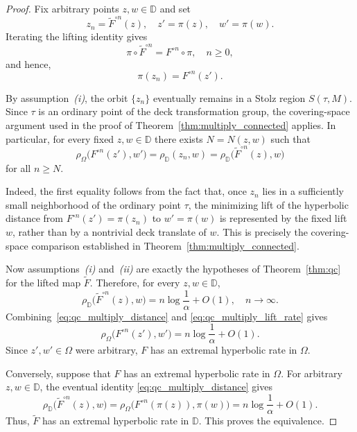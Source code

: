 \documentclass[12pt]{amsart}
\numberwithin{equation}{section}
\theoremstyle{plain}
\theoremstyle{definition}
\begin{document}
\begin{proof}
Fix arbitrary points $z,w\in\mathbb{D}$ and set
\begin{equation*}
z_n=\widetilde F^{\circ n}(z),
\quad
z'=\pi(z),
\quad
w'=\pi(w).
\end{equation*}
Iterating the lifting identity gives
\begin{equation*}
\label{eq:qc_multiply_lift}
\pi\circ\widetilde F^{\circ n}
=
F^{\circ n}\circ\pi,
\quad n\geq0,
\end{equation*}
and hence,
\begin{equation*}
\pi(z_n)=F^{\circ n}(z').
\end{equation*}

By assumption~\emph{(i)}, the orbit $\{z_n\}$ eventually remains in
a Stolz region $S(\tau,M)$. Since $\tau$ is an ordinary point of the
deck transformation group, the covering-space argument used in the
proof of Theorem~\ref{thm:multiply_connected} applies. In particular,
for every fixed $z,w\in\mathbb{D}$ there exists $N=N(z,w)$ such that
\begin{equation}
\label{eq:qc_multiply_distance}
\rho_\Omega\bigl(F^{\circ n}(z'),w'\bigr)
=
\rho_{\mathbb{D}}(z_n,w)
=
\rho_{\mathbb{D}}
\bigl(\widetilde F^{\circ n}(z),w\bigr)
\end{equation}
for all $n\geq N$.

Indeed, the first equality follows from the fact that, once $z_n$
lies in a sufficiently small neighborhood of the ordinary point
$\tau$, the minimizing lift of the hyperbolic distance from
$F^{\circ n}(z')=\pi(z_n)$ to $w'=\pi(w)$ is represented by the fixed
lift $w$, rather than by a nontrivial deck translate of $w$. This is
precisely the covering-space comparison established in
Theorem~\ref{thm:multiply_connected}.

Now assumptions~\emph{(i)} and~\emph{(ii)} are exactly the hypotheses
of Theorem~\ref{thm:qc} for the lifted map $\widetilde F$. Therefore,
for every $z,w\in\mathbb{D}$,
\begin{equation}
\label{eq:qc_multiply_lift_rate}
\rho_{\mathbb{D}}
\bigl(\widetilde F^{\circ n}(z),w\bigr)
=
n\log\frac{1}{\alpha}+O(1),
\quad n\to\infty.
\end{equation}
Combining~\eqref{eq:qc_multiply_distance} and
\eqref{eq:qc_multiply_lift_rate} gives
\begin{equation*}
\rho_\Omega
\bigl(F^{\circ n}(z'),w'\bigr)
=
n\log\frac{1}{\alpha}+O(1).
\end{equation*}
Since $z',w'\in\Omega$ were arbitrary, $F$ has an extremal
hyperbolic rate in $\Omega$.

Conversely, suppose that $F$ has an extremal hyperbolic rate in
$\Omega$. For arbitrary $z,w\in\mathbb{D}$, the eventual identity
\eqref{eq:qc_multiply_distance} gives
\begin{equation*}
\rho_{\mathbb{D}}
\bigl(\widetilde F^{\circ n}(z),w\bigr)
=
\rho_\Omega
\bigl(F^{\circ n}(\pi(z)),\pi(w)\bigr)
=
n\log\frac{1}{\alpha}+O(1).
\end{equation*}
Thus, $\widetilde F$ has an extremal hyperbolic rate in $\mathbb{D}$.
This proves the equivalence.
\end{proof}
\end{document}
